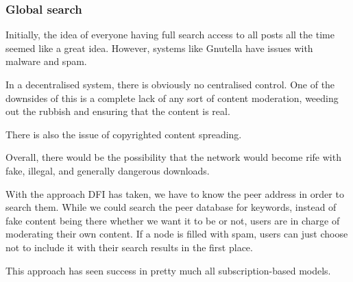 	\subsubsection{Global search}
	\begin{multicols}{2}
	Initially, the idea of everyone having full search access to all posts all
	the time seemed like a great idea. However, systems like Gnutella
	\cite{gnutella} have
	issues with malware and spam. 

	In a decentralised system, there is obviously no centralised control. One of
	the downsides of this is a complete lack of any sort of content moderation,
	weeding out the rubbish and ensuring that the content is real.

	There is also the issue of copyrighted content spreading. 

	Overall, there would be the possibility that the network would become rife
	with fake, illegal, and generally dangerous downloads.

	With the approach DFI has taken, we have to know the peer address in order
	to search them. While we could search the peer database for keywords,
	instead of fake content being there whether we want it to be or not, users
	are in charge of moderating their own content. If a node is filled with
	spam, users can just choose not to include it with their search results in
	the first place.

	This approach has seen success in pretty much all subscription-based models.

\end{multicols}

